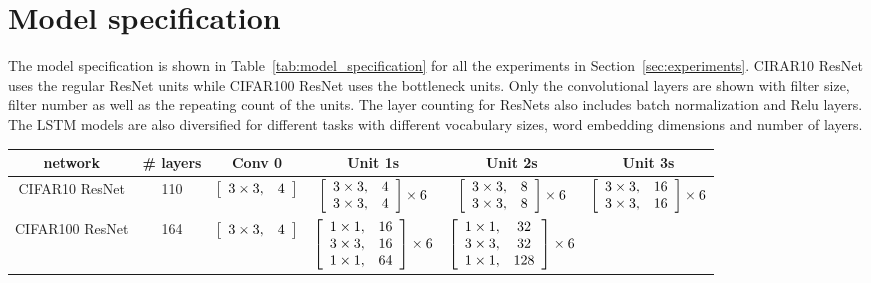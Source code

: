 \section{Model specification}
\label{sec:model_spec}
The model specification is shown in Table~\ref{tab:model_specification} for all the experiments in Section~\ref{sec:experiments}. 
CIRAR10 ResNet uses the regular ResNet units while CIFAR100 ResNet uses the bottleneck units. Only the convolutional layers are shown with filter size, filter number as well as the repeating count of the units. The layer counting for ResNets also includes batch normalization and Relu layers. The LSTM models are also diversified for different tasks with different vocabulary sizes, word embedding dimensions and number of layers.
\begin{table}
\vspace{1em}
\begin{small}
\centering
	\begin{tabular}{c@{\hskip 0.1in} c@{\hskip 0.1in} c@{\hskip 0.1in} c@{\hskip 0.1in} c@{\hskip 0.1in} c}
	\toprule
	network & \# layers & Conv 0 & Unit 1s & Unit 2s & Unit 3s \\
	\midrule
	CIFAR10 ResNet & 110 
	& $\left[\begin{array}{c c} 3 \times 3, & 4 \end{array} \right] $
	& $\left[\begin{array}{c c} 3 \times 3, & 4  \\ 3\times 3, & 4\end{array} \right]\times 6 $ 
	& $\left[\begin{array}{c c} 3 \times 3, & 8  \\ 3\times 3, & 8\end{array} \right]\times 6 $
	& $\left[\begin{array}{c c} 3 \times 3, & 16  \\ 3\times 3, & 16\end{array} \right]\times 6 $
	\\
	\midrule
	CIFAR100 ResNet & 164 
	& $\left[\begin{array}{c c} 3 \times 3, & 4 \end{array} \right] $
	& $\left[\begin{array}{c c} 1 \times 1, & 16  \\ 3\times 3, & 16 \\ 1 \times 1, & 64  \end{array} \right]\times 6  $
	& $\left[\begin{array}{c c} 1 \times 1, & 32  \\ 3\times 3, & 32 \\ 1 \times 1, & 128  \end{array} \right]\times 6  $

\end{tabular}
\end{small}
\end{table}
